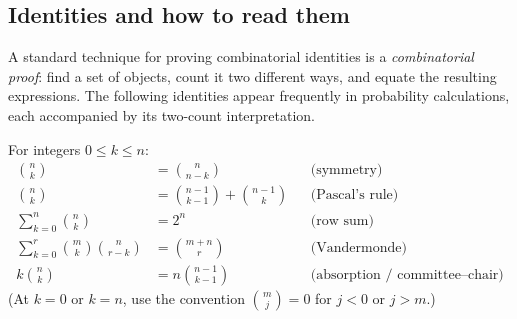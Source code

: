 \subsection{Identities and how to read them}

A standard technique for proving combinatorial identities is a
\emph{combinatorial proof}: find a set of objects, count it two different
ways, and equate the resulting expressions. The following identities appear
frequently in probability calculations, each accompanied by its two-count
interpretation.

\begin{formalbox}
For integers $0 \le k \le n$:
\begin{align}
\binom{n}{k} &= \binom{n}{n-k}
  &&\text{(symmetry)} \label{ch39:sym}\\[0.2em]
\binom{n}{k} &= \binom{n-1}{k-1} + \binom{n-1}{k}
  &&\text{(Pascal's rule)} \label{ch39:pascal}\\[0.2em]
\sum_{k=0}^{n}\binom{n}{k} &= 2^{n}
  &&\text{(row sum)} \label{ch39:rowsum}\\[0.2em]
\sum_{k=0}^{r}\binom{m}{k}\binom{n}{r-k} &= \binom{m+n}{r}
  &&\text{(Vandermonde)} \label{ch39:vander}\\[0.2em]
k\binom{n}{k} &= n\binom{n-1}{k-1}
  &&\text{(absorption / committee--chair)} \label{ch39:absorb}
\end{align}
(At $k = 0$ or $k = n$, use the convention $\binom{m}{j} = 0$ for $j < 0$ or $j > m$.)
\end{formalbox}

